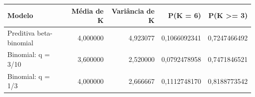 \begin{tabular}{lrrrr}
\toprule
Modelo & Média de K & Variância de K & P(K = 6) & P(K >= 3) \\
\midrule
Preditiva beta-binomial & 4,000000 & 4,923077 & 0,1066092341 & 0,7247466492 \\
Binomial: q = 3/10 & 3,600000 & 2,520000 & 0,0792478958 & 0,7471846521 \\
Binomial: q = 1/3 & 4,000000 & 2,666667 & 0,1112748170 & 0,8188773542 \\
\bottomrule
\end{tabular}
